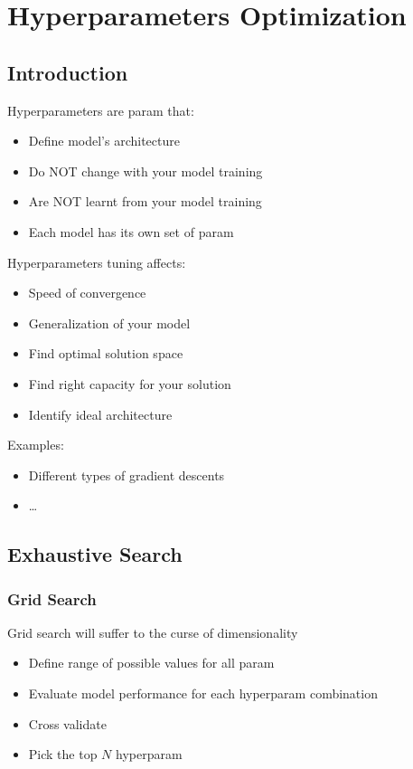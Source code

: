 \chapter{Hyperparameters Optimization}

\section{Introduction}
Hyperparameters are \ac{param} that:
\begin{itemize}
	\item Define model's architecture
	\item Do NOT change with your model training
	\item Are NOT learnt from your model training
	\item Each model has its own set of \ac{param}
\end{itemize}

Hyperparameters tuning affects:
\begin{itemize}
	\item Speed of convergence
	\item Generalization of your model
	\item Find optimal solution space
	\item Find right capacity for your solution
	\item Identify ideal architecture
\end{itemize}

Examples:
\begin{itemize}
	\item Different types of gradient descents
	\item \dots
\end{itemize}

\section{Exhaustive Search}
\subsection{Grid Search}
Grid search will suffer to the curse of dimensionality
\begin{itemize}
	\item Define range of possible values for all \ac{param}
	\item Evaluate model performance for each hyper\ac{param} combination
	\item Cross validate
	\item Pick the top $N$ hyper\ac{param}
\end{itemize}

